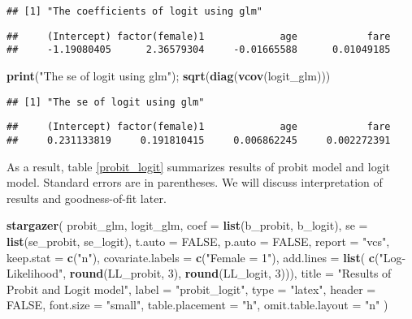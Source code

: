 \documentclass[
  12pt,
]{article}
\newenvironment{Shaded}{\begin{snugshade}}{\end{snugshade}}
\newcommand{\DataTypeTok}[1]{\textcolor[rgb]{0.13,0.29,0.53}{#1}}
\newcommand{\DecValTok}[1]{\textcolor[rgb]{0.00,0.00,0.81}{#1}}
\newcommand{\KeywordTok}[1]{\textcolor[rgb]{0.13,0.29,0.53}{\textbf{#1}}}
\newcommand{\NormalTok}[1]{#1}
\newcommand{\OtherTok}[1]{\textcolor[rgb]{0.56,0.35,0.01}{#1}}
\newcommand{\StringTok}[1]{\textcolor[rgb]{0.31,0.60,0.02}{#1}}
\begin{document}
\begin{verbatim}
## [1] "The coefficients of logit using glm"
\end{verbatim}

\begin{verbatim}
##     (Intercept) factor(female)1             age            fare 
##     -1.19080405      2.36579304     -0.01665588      0.01049185
\end{verbatim}

\begin{Shaded}
\begin{Highlighting}[]
\KeywordTok{print}\NormalTok{(}\StringTok{"The se of logit using glm"}\NormalTok{); }\KeywordTok{sqrt}\NormalTok{(}\KeywordTok{diag}\NormalTok{(}\KeywordTok{vcov}\NormalTok{(logit\_glm)))}
\end{Highlighting}
\end{Shaded}

\begin{verbatim}
## [1] "The se of logit using glm"
\end{verbatim}

\begin{verbatim}
##     (Intercept) factor(female)1             age            fare 
##     0.231133819     0.191810415     0.006862245     0.002272391
\end{verbatim}

As a result, table \ref{probit_logit} summarizes results of probit model and logit model.
Standard errors are in parentheses.
We will discuss interpretation of results and goodness-of-fit later.

\begin{Shaded}
\begin{Highlighting}[]
\KeywordTok{stargazer}\NormalTok{(}
\NormalTok{  probit\_glm, logit\_glm,}
  \DataTypeTok{coef =} \KeywordTok{list}\NormalTok{(b\_probit, b\_logit), }\DataTypeTok{se =} \KeywordTok{list}\NormalTok{(se\_probit, se\_logit),}
  \DataTypeTok{t.auto =} \OtherTok{FALSE}\NormalTok{, }\DataTypeTok{p.auto =} \OtherTok{FALSE}\NormalTok{,}
  \DataTypeTok{report =} \StringTok{"vcs"}\NormalTok{, }\DataTypeTok{keep.stat =} \KeywordTok{c}\NormalTok{(}\StringTok{"n"}\NormalTok{),}
  \DataTypeTok{covariate.labels =} \KeywordTok{c}\NormalTok{(}\StringTok{"Female = 1"}\NormalTok{),}
  \DataTypeTok{add.lines =} \KeywordTok{list}\NormalTok{(}
    \KeywordTok{c}\NormalTok{(}\StringTok{"Log{-}Likelihood"}\NormalTok{, }\KeywordTok{round}\NormalTok{(LL\_probit, }\DecValTok{3}\NormalTok{), }\KeywordTok{round}\NormalTok{(LL\_logit, }\DecValTok{3}\NormalTok{))),}
  \DataTypeTok{title =} \StringTok{"Results of Probit and Logit model"}\NormalTok{,}
  \DataTypeTok{label =} \StringTok{"probit\_logit"}\NormalTok{,}
  \DataTypeTok{type =} \StringTok{"latex"}\NormalTok{, }\DataTypeTok{header =} \OtherTok{FALSE}\NormalTok{, }\DataTypeTok{font.size =} \StringTok{"small"}\NormalTok{,}
  \DataTypeTok{table.placement =} \StringTok{"h"}\NormalTok{, }\DataTypeTok{omit.table.layout =} \StringTok{"n"}
\NormalTok{)}
\end{Highlighting}
\end{Shaded}
\end{document}

